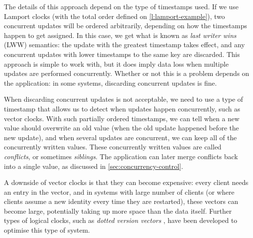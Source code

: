 The details of this approach depend on the type of timestamps used.
If we use Lamport clocks (with the total order defined on \autoref{l:lamport-example}), two concurrent updates will be ordered arbitrarily, depending on how the timestamps happen to get assigned.
In this case, we get what is known as \emph{last writer wins} (LWW) semantics: the update with the greatest timestamp takes effect, and any concurrent updates with lower timestamps to the same key are discarded.
This approach is simple to work with, but it does imply data loss when multiple updates are performed concurrently.
Whether or not this is a problem depends on the application: in some systems, discarding concurrent updates is fine.

When discarding concurrent updates is not acceptable, we need to use a type of timestamp that allows us to detect when updates happen concurrently, such as vector clocks.
With such partially ordered timestamps, we can tell when a new value should overwrite an old value (when the old update happened before the new update), and when several updates are concurrent, we can keep all of the concurrently written values.
These concurrently written values are called \emph{conflicts}, or sometimes \emph{siblings}.
The application can later merge conflicts back into a single value, as discussed in \autoref{sec:concurrency-control}.

A downside of vector clocks is that they can become expensive: every client needs an entry in the vector, and in systems with large number of clients (or where clients assume a new identity every time they are restarted), these vectors can become large, potentially taking up more space than the data itself.
Further types of logical clocks, such as \emph{dotted version vectors} \citep{Preguica:2010}, have been developed to optimise this type of system.

